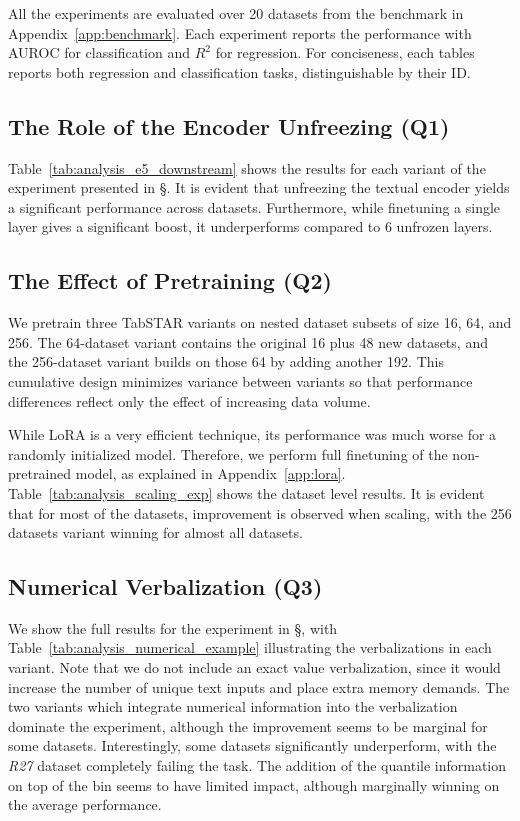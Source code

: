 All the experiments are evaluated over 20 datasets from the benchmark in Appendix~\ref{app:benchmark}. Each experiment reports the performance with AUROC for classification and $R^2$ for regression. For conciseness, each tables reports both regression and classification tasks, distinguishable by their ID.


\subsection{The Role of the Encoder Unfreezing (Q1)}
\label{app:analysis_unfreeze}

Table~\ref{tab:analysis_e5_downstream} shows the results for each variant of the experiment presented in \S{}. It is evident that unfreezing the textual encoder yields a significant performance across datasets. Furthermore, while finetuning a single layer gives a significant boost, it underperforms compared to 6 unfrozen layers. 


\subsection{The Effect of Pretraining (Q2)}
\label{app:analysis_scaling}

We pretrain three TabSTAR variants on nested dataset subsets of size 16, 64, and 256. The 64-dataset variant contains the original 16 plus 48 new datasets, and the 256-dataset variant builds on those 64 by adding another 192. This cumulative design minimizes variance between variants so that performance differences reflect only the effect of increasing data volume.

While LoRA \cite{hu_lora_2021} is a very efficient technique, its performance was much worse for a randomly initialized model. Therefore, we perform full finetuning of the non-pretrained model, as explained in Appendix~\ref{app:lora}. Table~\ref{tab:analysis_scaling_exp} shows the dataset level results. It is evident that for most of the datasets, improvement is observed when scaling, with the 256 datasets variant winning for almost all datasets.

\subsection{Numerical Verbalization (Q3)}
\label{app:analysis_numerical}

We show the full results for the experiment in \S{}, with Table~\ref{tab:analysis_numerical_example} illustrating the verbalizations in each variant. Note that we do not include an exact value verbalization, since it would increase the number of unique text inputs and place extra memory demands. The two variants which integrate numerical information into the verbalization dominate the experiment, although the improvement seems to be marginal for some datasets. Interestingly, some datasets significantly underperform, with the \textit{R27} dataset completely failing the task. The addition of the quantile information on top of the bin seems to have limited impact, although marginally winning on the average performance.

